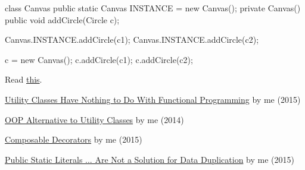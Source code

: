 \documentclass{article}
\begin{document}
\begin{pptWide}{2}
{\small\begin{ffcode}
class Canvas {
  public static Canvas INSTANCE =
    new Canvas();
  private Canvas() {}
  public void addCircle(Circle c);
}

Canvas.INSTANCE.addCircle(c1);
Canvas.INSTANCE.addCircle(c2);
\end{ffcode}
}
\par\columnbreak\par
{\small\begin{ffcode}
c = new Canvas();
c.addCircle(c1);
c.addCircle(c2);
\end{ffcode}
}
\end{pptWide}
\par
Read \href{https://www.yegor256.com/2016/06/27/singletons-must-die.html}{this}.
\plush{}



\href{https://www.yegor256.com/2015/02/20/utility-classes-vs-functional-programming.html}{Utility Classes Have Nothing to Do With Functional Programming} by me (2015)

\href{https://www.yegor256.com/2014/05/05/oop-alternative-to-utility-classes.html}{OOP Alternative to Utility Classes} by me (2014)

\href{https://www.yegor256.com/2015/02/26/composable-decorators.html}{Composable Decorators} by me (2015)

\href{https://www.yegor256.com/2015/07/06/public-static-literals.html}{Public Static Literals ... Are Not a Solution for Data Duplication} by me (2015)
\end{document}
